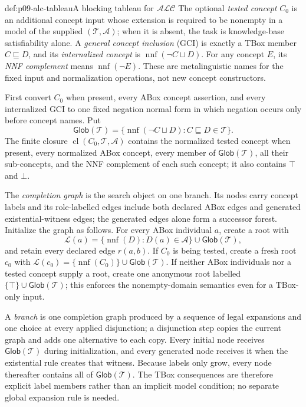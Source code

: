 \begin{hbmethod}{def:p09-alc-tableau}{A blocking tableau for \(\mathcal{ALC}\)}
The optional \emph{tested concept} \(C_0\) is an additional concept input whose
extension is required to be nonempty in a model of the supplied
\((\mathcal T,\mathcal A)\); when it is absent, the task is knowledge-base
satisfiability alone.  A \emph{general concept inclusion} (GCI) is exactly a TBox
member \(C\sqsubseteq D\), and its \emph{internalized concept} is
\(\operatorname{nnf}(\neg C\sqcup D)\).  For any concept \(E\), its
\emph{NNF complement} means \(\operatorname{nnf}(\neg E)\).  These are
metalinguistic names for the fixed input and normalization operations, not new
concept constructors.

First convert \(C_0\) when present, every ABox concept assertion, and every
internalized GCI to one fixed negation normal form in which negation occurs
only before concept names.  Put
\[
 \mathsf{Glob}(\mathcal T)
   =\{\operatorname{nnf}(\neg C\sqcup D):C\sqsubseteq D\in\mathcal T\}.
\]
The finite closure \(\operatorname{cl}(C_0,\mathcal T,\mathcal A)\) contains the normalized
tested concept when present, every normalized ABox concept, every member of
\(\mathsf{Glob}(\mathcal T)\), all their sub-concepts, and the NNF complement
of each such concept; it also contains \(\top\) and \(\bot\).

The \emph{completion graph} is the search object on one branch.  Its nodes
carry concept labels and its role-labelled edges include both declared ABox
edges and generated existential-witness edges; the generated edges alone form
a successor forest.  Initialize the graph as follows.  For every ABox
individual \(a\), create a root with
\[
 \mathcal L(a)=
 \{\operatorname{nnf}(D):D(a)\in\mathcal A\}
 \cup\mathsf{Glob}(\mathcal T),
\]
and retain every declared edge \(r(a,b)\).  If \(C_0\) is being tested, create
a fresh root \(c_0\) with
\(\mathcal L(c_0)=\{\operatorname{nnf}(C_0)\}\cup
\mathsf{Glob}(\mathcal T)\).  If neither ABox individuals nor a tested concept
supply a root, create one anonymous root labelled
\(\{\top\}\cup\mathsf{Glob}(\mathcal T)\); this enforces the nonempty-domain
semantics even for a TBox-only input.

A \emph{branch} is one completion graph produced by a sequence of legal
expansions and one choice at every applied disjunction; a disjunction step
copies the current graph and adds one alternative to each copy.  Every initial
node receives \(\mathsf{Glob}(\mathcal T)\) during initialization, and every
generated node receives it when the existential rule creates that witness.
Because labels only grow, every node thereafter contains all of
\(\mathsf{Glob}(\mathcal T)\).  The TBox consequences are therefore explicit
label members rather than an implicit model condition; no separate global
expansion rule is needed.


\end{hbmethod}
